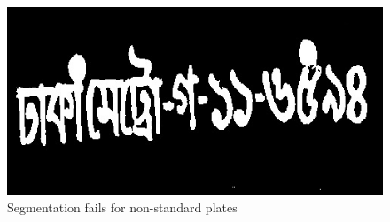\begin{figure}
\centering
\includegraphics[width=0.5\linewidth]{./img/experiment/stage.16/01-00-nostd}    
\caption{Segmentation fails for non-standard plates}
\label{fig:NonStandardPlates}
\end{figure}

